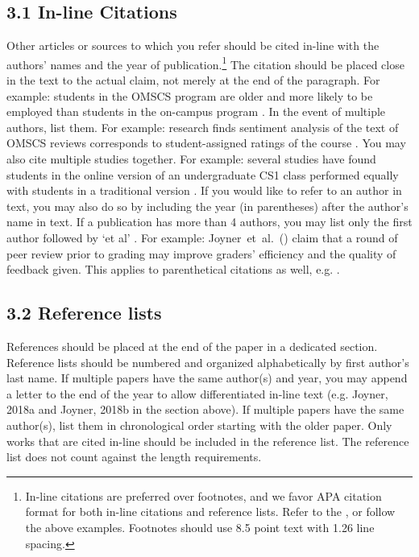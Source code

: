{{{{\subsection*{3.1 In-line Citations}
Other articles or sources to which you refer should be cited in-line with the
authors' names and the year of publication.\footnote{In-line citations are preferred over footnotes, and we favor APA citation format for both in-line citations and reference lists. Refer to the , or follow the above examples. Footnotes should use 8.5 point text with 1.26 line spacing.
} The citation should be placed close
in the text to the actual claim, not merely at the end of the paragraph. For
example: students in the OMSCS program are older and more likely to be employed
than students in the on-campus program \citep{Joyner17}. In the event of
multiple authors, list them. For example: research finds sentiment analysis of
the text of OMSCS reviews corresponds to student-assigned ratings of the course
\citep{Newman18}. You may also cite multiple studies together. For example:
several studies have found students in the online version of an undergraduate
CS1 class performed equally with students in a traditional version
\citep{Joyner18a,Joyner18b,Joyner19}. If you would like to refer to an author in
text, you may also do so by including the year (in parentheses) after the
author's name in text. If a publication has more than 4 authors, you may list
only the first author followed by `et al' . For example:
Joyner~et~al.~(\citeyear{Joyner16}) claim that a round of peer review prior to
grading may improve graders' efficiency and the quality of feedback given. This
applies to parenthetical citations as well, e.g. \citep{Joyner16}.

\subsection*{3.2 Reference lists}
References should be placed at the end of the paper in a dedicated section. Reference lists should be numbered and organized alphabetically by first author’s last name. If multiple papers have the same author(s) and year, you may append a letter to the end of the year to allow differentiated in-line text (e.g. Joyner, 2018a and Joyner, 2018b in the section above). If multiple papers have the same author(s), list them in chronological order starting with the older paper. Only works that are cited in-line should be included in the reference list. The reference list does not count against the length requirements.


}}}}
